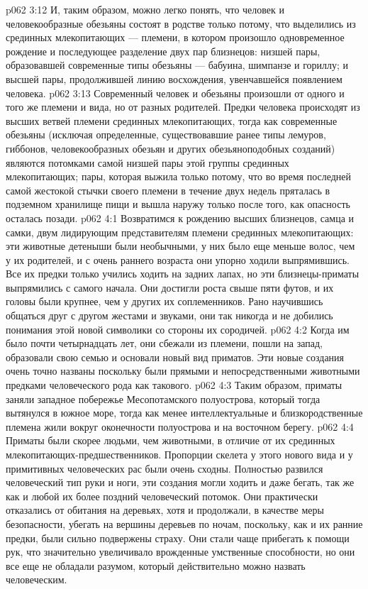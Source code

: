 \vs p062 3:12 И, таким образом, можно легко понять, что человек и человекообразные обезьяны состоят в родстве только потому, что выделились из срединных млекопитающих --- племени, в котором произошло одновременное рождение и последующее разделение двух пар близнецов: низшей пары, образовавшей современные типы обезьяны --- бабуина, шимпанзе и гориллу; и высшей пары, продолжившей линию восхождения, увенчавшейся появлением человека.
\vs p062 3:13 Современный человек и обезьяны произошли от одного и того же племени и вида, но от разных родителей. Предки человека происходят из высших ветвей племени срединных млекопитающих, тогда как современные обезьяны (исключая определенные, существовавшие ранее типы лемуров, гиббонов, человекообразных обезьян и других обезьяноподобных созданий) являются потомками самой низшей пары этой группы срединных млекопитающих; пары, которая выжила только потому, что во время последней самой жестокой стычки своего племени в течение двух недель пряталась в подземном хранилище пищи и вышла наружу только после того, как опасность осталась позади.
\vs p062 4:1 Возвратимся к рождению высших близнецов, самца и самки, двум лидирующим представителям племени срединных млекопитающих: эти животные детеныши были необычными, у них было еще меньше волос, чем у их родителей, и с очень раннего возраста они упорно ходили выпрямившись. Все их предки только учились ходить на задних лапах, но эти близнецы\hyp{}приматы выпрямились с самого начала. Они достигли роста свыше пяти футов, и их головы были крупнее, чем у других их соплеменников. Рано научившись общаться друг с другом жестами и звуками, они так никогда и не добились понимания этой новой символики со стороны их сородичей.
\vs p062 4:2 Когда им было почти четырнадцать лет, они сбежали из племени, пошли на запад, образовали свою семью и основали новый вид приматов. Эти новые создания очень точно названы  поскольку были прямыми и непосредственными животными предками человеческого рода как такового.
\vs p062 4:3 Таким образом, приматы заняли западное побережье Месопотамского полуострова, который тогда вытянулся в южное море, тогда как менее интеллектуальные и близкородственные племена жили вокруг оконечности полуострова и на восточном берегу.
\vs p062 4:4 \pc Приматы были скорее людьми, чем животными, в отличие от их срединных млекопитающих\hyp{}предшественников. Пропорции скелета у этого нового вида и у примитивных человеческих рас были очень сходны. Полностью развился человеческий тип руки и ноги, эти создания могли ходить и даже бегать, так же как и любой их более поздний человеческий потомок. Они практически отказались от обитания на деревьях, хотя и продолжали, в качестве меры безопасности, убегать на вершины деревьев по ночам, поскольку, как и их ранние предки, были сильно подвержены страху. Они стали чаще прибегать к помощи рук, что значительно увеличивало врожденные умственные способности, но они все еще не обладали разумом, который действительно можно назвать человеческим.
